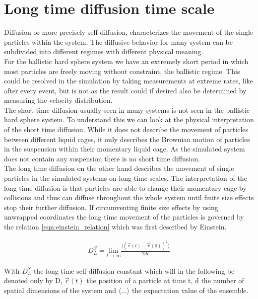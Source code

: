 \section{Long time diffusion time scale}
\label{sec:diffusion_metastable_liquid}
Diffusion or more precisely self-diffusion, characterizes the movement of the single particles within the system. The diffusive behavior for many system can be subdivided into different regimes with different physical meaning.\\ 

For the ballistic hard sphere system we have an extremely short period in which most particles are freely moving without constraint, the ballistic regime. This could be resolved in the simulation by taking measurements at extreme rates, like after every event, but is not as the result could if desired also be determined by measuring the velocity distribution.\\ 

The short time diffusion usually seen in many systems is not seen in the ballistic hard sphere system. To understand this we can look at the physical interpretation of the short time diffusion. While it does not describe the movement of particles between different liquid cages, it only describes the Brownian motion of particles in the suspension within their momentary liquid cage. As the simulated system does not contain any suspension there is no short time diffusion.\\

The long time diffusion on the other hand describes the movement of single particles in the simulated systems on long time scales. The interpretation of the long time diffusion is that particles are able to change their momentary cage by collisions and thus can diffuse throughout the whole system until finite size effects stop their further diffusion. If circumventing finite size effects by using unwrapped coordinates the long time movement of the particles is governed by the relation \autoref{eqn:einstein_relation} which was first described by Einstein\cite{Albert1905}.

\begin{align}
\label{eqn:einstein_relation}
D^S_L = \underset{t\rightarrow \infty}{\text{lim}} \frac{\langle (\vec{r}(t) - \vec{r}(0) )^2 \rangle}{2 d t}
\end{align}

With $D^S_L$ the long time self-diffusion constant which will in the following be denoted only by D, $\vec{r}(t)$ the position of a particle at time t, d the number of spatial dimensions of the system and $\langle ... \rangle$ the expectation value of the ensemble.\\

